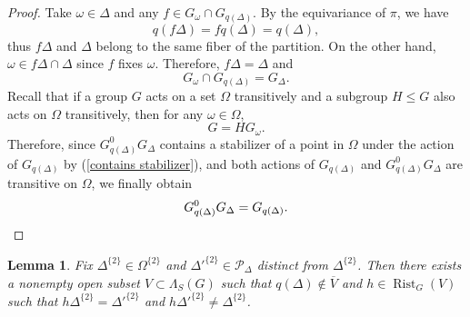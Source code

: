 \documentclass[11pt,letterpaper]{article}
\DeclareMathOperator{\rist}{Rist}
\newtheorem{lem}[thm]{Lemma}
\theoremstyle{definition}
\theoremstyle{remark}
\begin{document}
\begin{proof}
    Take $\omega \in \Delta$ and any $f \in G_\omega \cap G_{q(\Delta)}$. By the equivariance of $\pi$, we have
    $$
    q(f\Delta)=fq(\Delta)=q(\Delta),
    $$ thus $f\Delta$ and $\Delta$  belong to the same fiber of the partition. On the other hand,
    $\omega \in f\Delta \cap \Delta$ since $f$ fixes $\omega$. Therefore, $f\Delta=\Delta$ and 
    \begin{equation}\label{contains stabilizer}
    G_\omega \cap G_{q(\Delta)}=G_\Delta.
    \end{equation}
    Recall that if a group $G$ acts on a set $\Omega$ transitively and a subgroup $H \leq G$ also acts on $\Omega$ transitively, then for any $\omega \in \Omega$,
    $$
    G=H G_\omega.
    $$
    Therefore, since $G_{q(\Delta)}^0G_\Delta$ contains a stabilizer of a point in $\Omega$ under the action of $G_{q(\Delta)}$ by (\ref{contains stabilizer}), and both actions of $G_{q(\Delta)}$ and $G_{q(\Delta)}^0 G_{\Delta}$ are transitive on $\Omega$, we finally obtain
    $$
    G_{q(\Delta)}^0 G_\Delta=G_{q(\Delta)}. \qedhere
    $$
\end{proof}

\begin{lem}\label{Delta and Delta'}
    Fix $\Delta^{\{2\}} \in \Omega^{\{2\}}$ and $\Delta'^{\{2\}} \in \mathcal{P}_\Delta$ distinct from $\Delta^{\{2\}}$. Then there exists a nonempty open subset $V \subset \Lambda_S(G)$ such that $q(\Delta) \notin \overline{V}$ and $h \in \rist_G(V)$ such that $h\Delta^{\{2\}} = \Delta'^{\{2\}}$ and $h\Delta'^{\{2\}} \neq \Delta^{\{2\}}$.
\end{lem}
\end{document}
